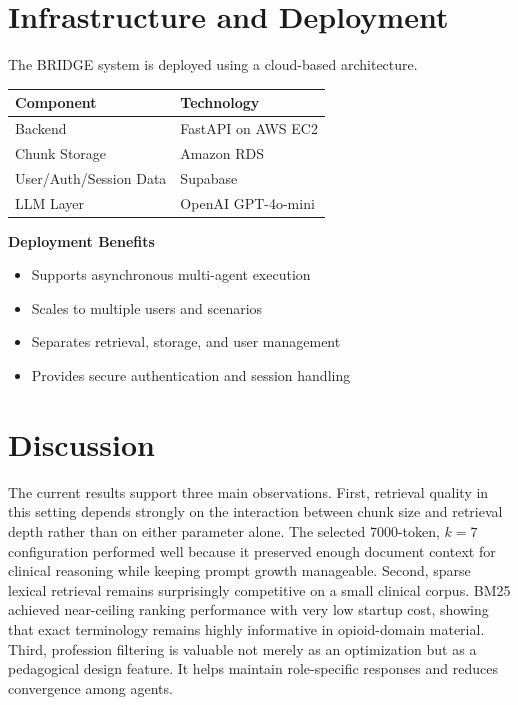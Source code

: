 \documentclass[12pt]{article}
\begin{document}
\section{Infrastructure and Deployment}

The BRIDGE system is deployed using a cloud-based architecture.

\begin{center}
\begin{tabular}{>{\raggedright\arraybackslash}p{1.8in} >{\raggedright\arraybackslash}p{3.8in}}
\toprule
\textbf{Component} & \textbf{Technology} \\
\midrule
Backend & FastAPI on AWS EC2 \\
Chunk Storage & Amazon RDS \\
User/Auth/Session Data & Supabase \\
LLM Layer & OpenAI GPT-4o-mini \\
\bottomrule
\end{tabular}
\end{center}

\textbf{Deployment Benefits}

\begin{itemize}[leftmargin=1.5em]
    \item Supports asynchronous multi-agent execution
    \item Scales to multiple users and scenarios
    \item Separates retrieval, storage, and user management
    \item Provides secure authentication and session handling
\end{itemize}

\section{Discussion}

The current results support three main observations. First, retrieval quality in this setting depends strongly on the interaction between chunk size and retrieval depth rather than on either parameter alone. The selected 7000-token, $k=7$ configuration performed well because it preserved enough document context for clinical reasoning while keeping prompt growth manageable. Second, sparse lexical retrieval remains surprisingly competitive on a small clinical corpus. BM25 achieved near-ceiling ranking performance with very low startup cost, showing that exact terminology remains highly informative in opioid-domain material. Third, profession filtering is valuable not merely as an optimization but as a pedagogical design feature. It helps maintain role-specific responses and reduces convergence among agents.
\end{document}
